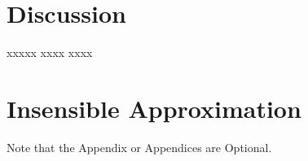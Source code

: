 \documentclass[12pt,twoside]{article}
\begin{document}
\section{Discussion}
\label{sec:discussion}
xxxxx xxxx xxxx 



\appendix
\section{Insensible Approximation}

Note that the Appendix or Appendices are Optional.
\end{document}
